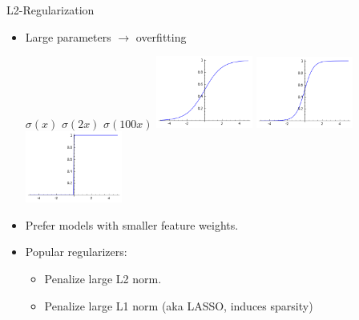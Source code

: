 
\begin{vbframe}{L2-Regularization}

\vfill

\begin{itemize}
\item Large parameters $\to$ overfitting
\begin{center}
$\sigma(x)$ \hspace{1.85cm}  $\sigma(2x)$\hspace{1.85cm} $\sigma(100x)$
\includegraphics[width = 0.25\textwidth]{./figure/sigmoid1x}
\includegraphics[width = 0.25\textwidth]{./figure/sigmoid2x}
\includegraphics[width = 0.25\textwidth]{./figure/sigmoid100x}
\end{center}
\item Prefer models with smaller feature weights.
\item Popular regularizers: 
\begin{itemize}
 \item Penalize large L2 norm.
 \item Penalize large L1 norm (aka LASSO, induces sparsity)
\end{itemize}
\end{itemize}

\vfill

\end{vbframe}



